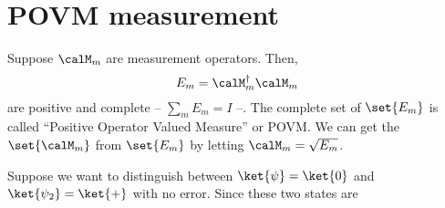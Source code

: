 \section{POVM measurement}
Suppose \(\calM_m\) are measurement operators. Then, 
\begin{equation*}
    E_m = \calM_m^{\dagger} \calM_m
\end{equation*}
are positive and complete -- \(\sum_m E_m = I\) --. The complete set of \(\set{E_m}\) is called ``Positive Operator Valued Measure'' or POVM. We can get the \(\set{\calM_m}\) from \(\set{E_m}\) by letting \(\calM_m = \sqrt{E_m}\).
\begin{example}
    Suppose we want to distinguish between \(\ket{\psi} = \ket{0}\) and \(\ket{\psi_2} = \ket{+}\) with no error. Since these two states are 
\end{example}


